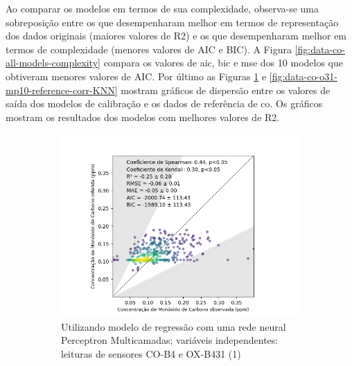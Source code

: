 Ao comparar os modelos em termos de sua complexidade, observa-se uma sobreposição entre os que desempenharam melhor em termos de representação dos dados originais (maiores valores de R2) e os que desempenharam melhor em termos de complexidade (menores valores de AIC e BIC). A Figura \ref{fig:data-co-all-models-complexity} compara os valores de \acrshort{aic}, \acrshort{bic} e \acrshort{mse} dos 10 modelos que obtiveram menores valores de AIC. Por último as Figuras \ref{fig:data-co-o31-reference-corr-MLP} e \ref{fig:data-co-o31-mp10-reference-corr-KNN} mostram gráficos de dispersão entre os valores de saída dos modelos de calibração e os dados de referência de \acrshort{co}. Os gráficos mostram os resultados dos modelos com melhores valores de R2.

\begin{figure}[h]
    \centering
    \caption{Gráfico de dispersão das leituras do múltiplos sensores e a estação de referência para medição de \acrshort{co}}
    \begin{subfigure}{0.495\textwidth}
        \includegraphics[width=\textwidth]{chapters/4-CALIBRAÇÃO MÚLTIPLOS SENSORES/Figuras/CO-co-o31-mlp-Regression.png}
        \caption{Utilizando modelo de regressão com uma rede neural Perceptron Multicamadas; variáveis independentes: leituras de sensores CO-B4 e OX-B431 (1)}
        \label{fig:data-co-o31-reference-corr-MLP}
    \end{subfigure}
    \hfill
    \begin{subfigure}{0.495\textwidth}

\end{subfigure}
\end{figure}

